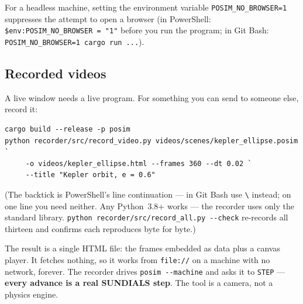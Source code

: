 \documentclass[11pt]{article}
\newcommand{\kw}[1]{\texttt{\uppercase{#1}}}
\newcommand{\code}[1]{\texttt{#1}}
\begin{document}
For a headless machine, setting the environment variable
\code{POSIM\_NO\_BROWSER=1} suppresses the attempt to open a browser
(in PowerShell: \code{\$env:POSIM\_NO\_BROWSER = "1"} before you run
the program; in Git Bash: \code{POSIM\_NO\_BROWSER=1 cargo run ...}).

\subsection{Recorded videos}\label{sec:videos}

A live window needs a live program. For something you can send to
someone else, record it:

\begin{lstlisting}
cargo build --release -p posim
python recorder/src/record_video.py videos/scenes/kepler_ellipse.posim `
     -o videos/kepler_ellipse.html --frames 360 --dt 0.02 `
     --title "Kepler orbit, e = 0.6"
\end{lstlisting}

(The backtick is PowerShell's line continuation --- in Git Bash use
\code{\textbackslash} instead; on one line you need neither. Any
Python~3.8+ works --- the recorder uses only the standard library.
\code{python recorder/src/record\_all.py -{}-check} re-records all
thirteen and confirms each reproduces byte for byte.)

The result is a single HTML file: the frames embedded as data plus a
canvas player. It fetches nothing, so it works from \code{file://} on a
machine with no network, forever. The recorder drives
\code{posim -{}-machine} and asks it to \kw{step} --- \textbf{every
advance is a real SUNDIALS step}. The tool is a camera, not a physics
engine.
\end{document}

